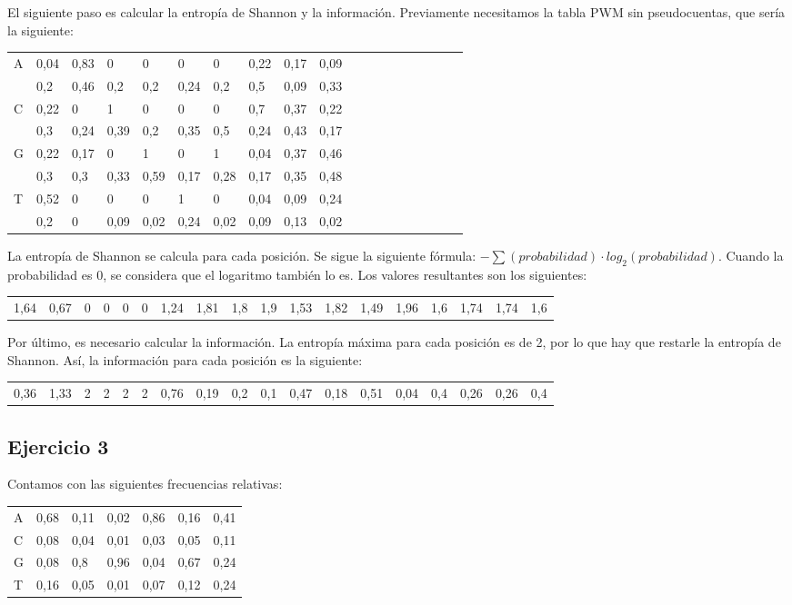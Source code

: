 El siguiente paso es calcular la entropía de Shannon y la información. Previamente necesitamos la tabla PWM sin pseudocuentas, que sería la siguiente:
\begin{table}[h]
\begin{tabular}{l | llllllllllllllllll}
A & 0,04 & 0,83 & 0 & 0 & 0 & 0 & 0,22 & 0,17 & 0,09 \\
& 0,2 & 0,46 & 0,2  & 0,2  & 0,24 & 0,2  & 0,5  & 0,09 & 0,33 \\
C & 0,22  & 0    & 1 & 0 & 0 & 0 & 0,7  & 0,37 & 0,22 \\
& 0,3 & 0,24 & 0,39 & 0,2  & 0,35 & 0,5  & 0,24 & 0,43 & 0,17 \\
G & 0,22  & 0,17 & 0 & 1 & 0 & 1 & 0,04 & 0,37 & 0,46 \\
& 0,3 & 0,3  & 0,33 & 0,59 & 0,17 & 0,28 & 0,17 & 0,35 & 0,48 \\
T & 0,52 & 0    & 0 & 0 & 1 & 0 & 0,04 & 0,09 & 0,24 \\
& 0,2 & 0    & 0,09 & 0,02 & 0,24 & 0,02 & 0,09 & 0,13 & 0,02
\end{tabular}
\end{table}
\newpage
La entropía de Shannon se calcula para cada posición. Se sigue la siguiente fórmula: $- \sum (probabilidad) \cdot log_2 (probabilidad) $. Cuando la probabilidad es 0, se considera que el logaritmo también lo es. Los valores resultantes son los siguientes:
\begin{table}[htbp]
\small
\begin{tabular}{llllllllllllllllll}
1,64 & 0,67 & 0 & 0 & 0 & 0 & 1,24 & 1,81 & 1,8 & 1,9 & 1,53 & 1,82 & 1,49 & 1,96 & 1,6 & 1,74 & 1,74 & 1,6
\end{tabular}
\end{table} 

Por último, es necesario calcular la información. La entropía máxima para cada posición es de 2, por lo que hay que restarle la entropía de Shannon. Así, la información para cada posición es la siguiente: 
\begin{table}[htbp]
\small
\begin{tabular}{llllllllllllllllll}
0,36 & 1,33 & 2 & 2 & 2 & 2 & 0,76 & 0,19 & 0,2 & 0,1 & 0,47 & 0,18 & 0,51 & 0,04 & 0,4 & 0,26 & 0,26 & 0,4
\end{tabular}
\end{table}
\newpage
\subsection{Ejercicio 3}
Contamos con las siguientes frecuencias relativas:
\begin{table}[h]
\centering
\begin{tabular}{l | llllll}
A & 0,68 & 0,11 & 0,02 & 0,86 & 0,16 & 0,41 \\
C & 0,08 & 0,04 & 0,01 & 0,03 & 0,05 & 0,11 \\
G & 0,08 & 0,8  & 0,96 & 0,04 & 0,67 & 0,24 \\
T & 0,16 & 0,05 & 0,01 & 0,07 & 0,12 & 0,24
\end{tabular}
\end{table}

